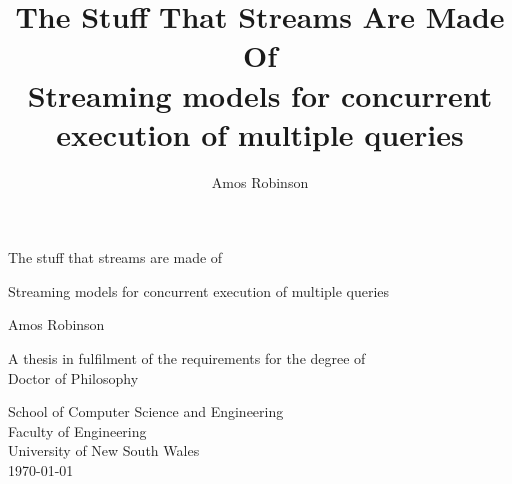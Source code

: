 \thispagestyle{empty}
\title{
  {The Stuff That Streams Are Made Of} \\
  {\Large Streaming models for concurrent execution of multiple queries} \\
  }

\author{Amos Robinson}


\begin{titlepage}
    \begin{center}
        \vspace*{1cm}
        
        { \LARGE The stuff that streams are made of }
        \Large
        
        \vspace{0.5cm}
        Streaming models for concurrent execution of multiple queries
        
        \vspace{1.5cm}
        
        Amos Robinson
        
        \vfill

      A thesis in fulfilment of the requirements for the degree of \\
      Doctor of Philosophy
        
        \vspace{0.8cm}

        School of Computer Science and Engineering\\
        Faculty of Engineering \\
        University of New South Wales\\
        \today
    \end{center}
\end{titlepage}
